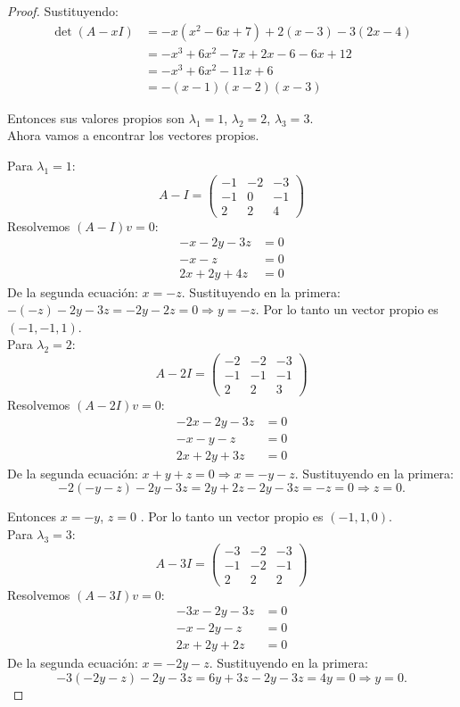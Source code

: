 \documentclass[11pt]{article}
\begin{document}
\begin{proof}
Sustituyendo:
\begin{align*}
   \det(A - x I) &= -x(x^2 - 6x+ 7) + 2(x - 3) - 3(2x- 4) \\
    &= -x^3 + 6x^2 - 7x + 2x - 6 - 6x + 12 \\
    &= -x^3 + 6x^2 - 11x + 6 \\
    &= -(x - 1)(x- 2)(x - 3)
\end{align*}

Entonces sus valores propios son $\lambda_1 = 1$, $\lambda_2 = 2$, $\lambda_3 = 3$. \\[10pt]
Ahora vamos a encontrar los vectores propios.

Para $\lambda_1 = 1$:
\[
A - I = \begin{pmatrix} -1 & -2 & -3 \\ -1 & 0 & -1 \\ 2 & 2 & 4 \end{pmatrix}
\]
Resolvemos $(A - I)v = 0$:
\begin{align*}
-x - 2y - 3z &= 0 \\
-x - z &= 0 \\
2x + 2y + 4z &= 0
\end{align*}
De la segunda ecuación: $x = -z$. Sustituyendo en la primera: $-(-z) - 2y - 3z = -2y - 2z = 0 \Rightarrow y = -z$. Por lo tanto 
un vector propio es $(-1, -1 , 1)$.\\[10pt]

Para $\lambda_2 = 2$:
\[
A - 2I = \begin{pmatrix} -2 & -2 & -3 \\ -1 & -1 & -1 \\ 2 & 2 & 3 \end{pmatrix}
\]
Resolvemos $(A - 2I)v = 0$:
\begin{align*}
-2x - 2y - 3z &= 0 \\
-x - y - z &= 0 \\
2x + 2y + 3z &= 0
\end{align*}
De la segunda ecuación: $x + y + z = 0 \Rightarrow x = -y - z$. Sustituyendo en la primera: 
\[-2(-y - z) - 2y - 3z = 2y + 2z - 2y - 3z = -z = 0 \Rightarrow z = 0.\]

Entonces $x = -y$, $z = 0$ . Por lo tanto un vector propio es $(-1,1,0)$.\\[10pt]

Para $\lambda_3 = 3$:
\[
A - 3I = \begin{pmatrix} -3 & -2 & -3 \\ -1 & -2 & -1 \\ 2 & 2 & 2 \end{pmatrix}
\]
Resolvemos $(A - 3I)v = 0$:
\begin{align*}
-3x - 2y - 3z &= 0 \\
-x - 2y - z &= 0 \\
2x + 2y + 2z &= 0
\end{align*}
De la segunda ecuación: $x = -2y - z$. Sustituyendo en la primera: \[-3(-2y - z) - 2y - 3z = 6y + 3z - 2y - 3z = 4y = 0 \Rightarrow y = 0.\]


\end{proof}
\end{document}
